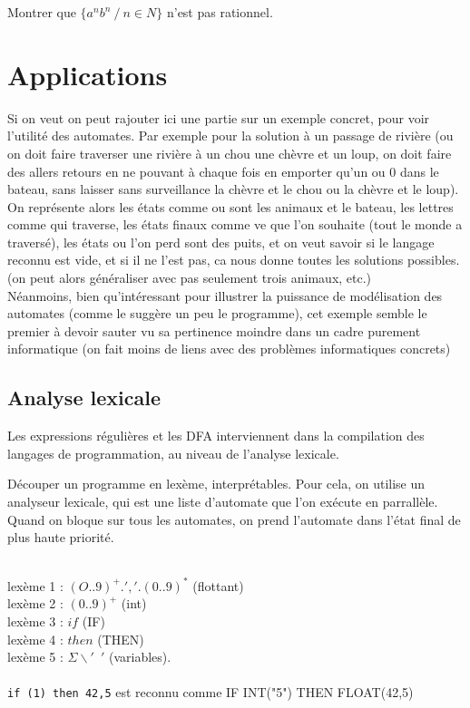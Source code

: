 \begin{example}
	Montrer que $\{a^n b^n \: / \: n \in N\}$ n'est pas rationnel.
\end{example}

\section{Applications}

\begin{com}
	Si on veut on peut rajouter ici une partie  sur un exemple concret, pour voir l'utilité des automates. Par exemple pour la solution à un passage de rivière (ou on doit faire traverser une rivière à un chou une chèvre et un loup, on doit faire des allers retours en ne pouvant à chaque fois en emporter qu'un ou 0 dans le bateau, sans laisser sans surveillance la chèvre et le chou ou la chèvre et le loup). On représente alors les états comme ou sont les animaux et le bateau, les lettres comme qui traverse, les états finaux comme ve que l'on souhaite (tout le monde a traversé), les états ou l'on perd sont des puits, et on veut savoir si le langage reconnu est vide, et si il ne l'est pas, ca nous donne toutes les solutions possibles.  (on peut alors généraliser avec pas seulement trois animaux, etc.)\\
	
	Néanmoins, bien qu'intéressant pour illustrer la puissance de modélisation des automates (comme le suggère un peu le programme), cet exemple semble le premier à devoir sauter vu sa pertinence moindre dans un cadre purement informatique (on fait moins de liens avec des problèmes informatiques concrets)
\end{com}

\subsection{Analyse lexicale}

Les expressions régulières et les DFA interviennent dans la compilation des langages de programmation, au niveau de l'analyse lexicale.

\begin{principe}
	Découper un programme en lexème, interprétables. Pour cela, on utilise un analyseur lexicale, qui est une liste d'automate que l'on exécute en parrallèle. Quand on bloque sur tous les automates, on prend l'automate dans l'état final de plus haute priorité.
\end{principe}

\begin{example} \\
	lexème 1 : $(O..9)^+ . ','.(0..9)^*$ (flottant)\\
	lexème 2 : $(0..9)^+$ (int) \\
	lexème 3 : $if$ (IF) \\
	lexème 4 : $then$ (THEN) \\
	lexème 5 : $\Sigma \backslash '\enspace'$ (variables).\\\\
	\texttt{if (1) then 42,5} est reconnu comme IF INT("5") THEN FLOAT(42,5)
\end{example}

